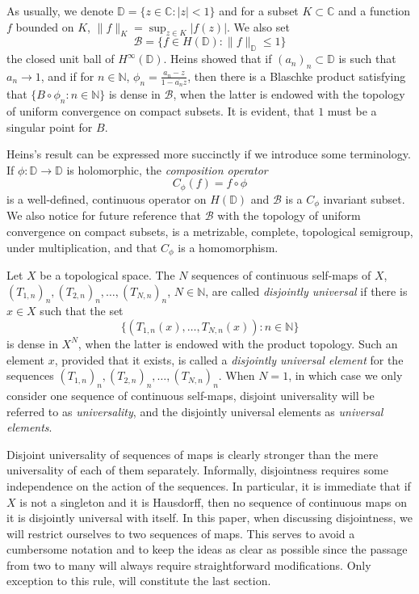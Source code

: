 \documentclass[12pt,a4paper]{amsart}
\theoremstyle{plain}
\theoremstyle{definition}
\theoremstyle{remark}
\theoremstyle{fact}
\begin{document}
As usually, we denote $\mathbb{D}=\{z\in \mathbb{C}: |z|<1\}$ and for a subset $K\subset \mathbb{C}$ and a function $f$ bounded on $K$, $\|f\|_K=\sup_{z\in K}|f(z)|$. We also set 
$$
\mathcal{B}=\{f\in H(\mathbb{D}): \|f\|_{\mathbb{D}}\leq 1\}
$$ 
the closed unit ball of $H^{\infty}(\mathbb{D})$. Heins \cite{he} showed that if $(a_n)_n\subset \mathbb{D}$ is such that $a_n\rightarrow 1$, and if for $n\in \mathbb{N}$, $\phi_n=\frac{a_n-z}{1-\overline{a_n}z}$, then there is a Blaschke product satisfying that $\{B\circ \phi_n: n\in \mathbb{N}\}$ is dense in $\mathcal{B}$, when the latter is endowed with the topology of uniform convergence on compact subsets. It is evident, that $1$ must be a singular point for $B$. 

Heins's result can be expressed more succinctly if we introduce some terminology. If $\phi :\mathbb{D}\rightarrow \mathbb{D}$ is holomorphic, the {\it composition operator} 
$$
C_{\phi}(f)=f\circ \phi
$$
is a well-defined, continuous operator on $H(\mathbb{D})$ and $\mathcal{B}$ is a $C_{\phi}$ invariant subset. We also notice for future reference that $\mathcal{B}$ with the topology of uniform convergence on compact subsets, is a metrizable, complete, topological semigroup, under multiplication, and that $C_{\phi}$ is a homomorphism.  

Let $X$ be a topological space. The $N$ sequences of continuous self-maps of $X$,\\  $(T_{1,n})_n, (T_{2,n})_n,\dots ,(T_{N,n})_n$, $N\in \mathbb{N}$, are called {\it disjointly universal} if there is $x\in X$ such that the set
$$
\{(T_{1,n}(x),\dots ,T_{N,n}(x)): n\in \mathbb{N}\}
$$
is dense in $X^N$, when the latter is endowed with the product topology. Such an element $x$, provided that it exists, is called a {\it disjointly universal element} for the sequences $(T_{1,n})_n, (T_{2,n})_n,\dots ,(T_{N,n})_n$. When $N=1$, in which case we only consider one sequence of continuous self-maps, disjoint universality will be referred to as {\it universality}, and the disjointly universal elements as {\it universal elements}. 

Disjoint universality of sequences of maps is clearly stronger than the mere universality of each of them separately. Informally, disjointness requires some independence on the action of the sequences. In particular, it is immediate that if $X$ is not a singleton and it is Hausdorff, then no sequence of continuous maps on it is disjointly universal with itself. In this paper, when discussing disjointness, we will restrict ourselves to two sequences of maps. This serves to avoid a cumbersome notation and to keep the ideas as clear as possible since the passage from two to many will always require straightforward modifications. Only exception to this rule, will constitute the last section.
\end{document}
